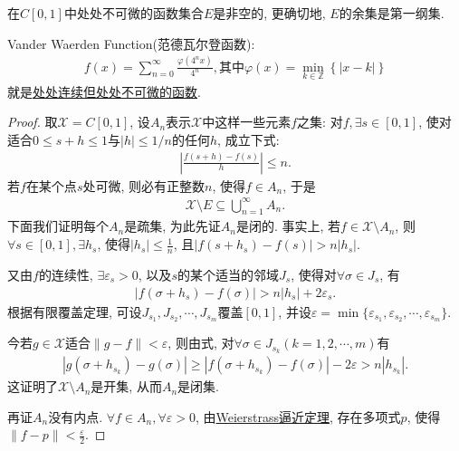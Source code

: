 \documentclass[../../main.tex]{subfiles}%
\begin{document}
\begin{theorem}
在$C[0,1]$中处处不可微的函数集合$E$是非空的, 更确切地, $E$的余集是第一纲集.
\end{theorem}
\begin{remark}
Vander Waerden Function(范德瓦尔登函数):
\begin{align*}
f\left( x \right) =\sum_{n=0}^{\infty}{\frac{\varphi \left( 4^nx \right)}{4^n}},\text{其中}\varphi \left( x \right) =\underset{k\in \mathbb{Z}}{\min}\left\{ \left| x-k \right| \right\}
\end{align*}
就是\href{https://mp.weixin.qq.com/s/ki-x99Me_kKvQUvfXS-GGQ}{处处连续但处处不可微的函数}.
\end{remark}
\begin{proof}

取$\mathscr{X}=C[0,1]$, 设$A_n$表示$\mathscr{X}$中这样一些元素$f$之集: 对$f,\exists s\in[0,1]$, 使对适合$0\leqslant s+h\leqslant1$与$|h|\leqslant1/n$的任何$h$, 成立下式:
\begin{align*}
\left|\frac{f(s+h)-f(s)}{h}\right|\leqslant n.
\end{align*}
若$f$在某个点$s$处可微, 则必有正整数$n$, 使得$f\in A_n$, 于是
\begin{align}
\mathscr{X}\setminus E\subseteq\bigcup\limits_{n=1}^{\infty}A_n.
\end{align}
下面我们证明每个$A_n$是疏集, 为此先证$A_n$是闭的. 事实上, 若$f\in\mathscr{X}\setminus A_n$, 则$\forall s\in[0,1],\exists h_s$, 使得$|h_s|\leqslant\frac{1}{n}$, 且$|f(s+h_s)-f(s)|>n|h_s|$.

又由$f$的连续性, $\exists\varepsilon_s>0$, 以及$s$的某个适当的邻域$J_s$, 使得对$\forall\sigma\in J_s$, 有
\begin{align}
|f(\sigma+h_s)-f(\sigma)|>n|h_s|+2\varepsilon_s.
\end{align}
根据有限覆盖定理, 可设$J_{s_1},J_{s_2},\cdots,J_{s_m}$覆盖$[0,1]$, 并设$\varepsilon=\min\{\varepsilon_{s_1},\varepsilon_{s_2},\cdots,\varepsilon_{s_m}\}$.

今若$g\in\mathscr{X}$适合$\|g-f\|<\varepsilon$, 则由式, 对$\forall\sigma\in J_{s_k}(k=1,2,\cdots,m)$有
\begin{align*}
|g(\sigma+h_{s_k})-g(\sigma)|\geqslant|f(\sigma+h_{s_k})-f(\sigma)|-2\varepsilon>n|h_{s_k}|.
\end{align*}
这证明了$\mathscr{X}\setminus A_n$是开集, 从而$A_n$是闭集.

再证$A_n$没有内点. $\forall f\in A_n,\forall\varepsilon>0$, 由\hyperref[Basis-of-Analytics-theorem:多项式逼近有限阶光滑函数]{Weierstrass逼近定理}, 存在多项式$p$, 使得$\|f-p\|<\frac{\varepsilon}{2}$.


\end{proof}
\end{document}
